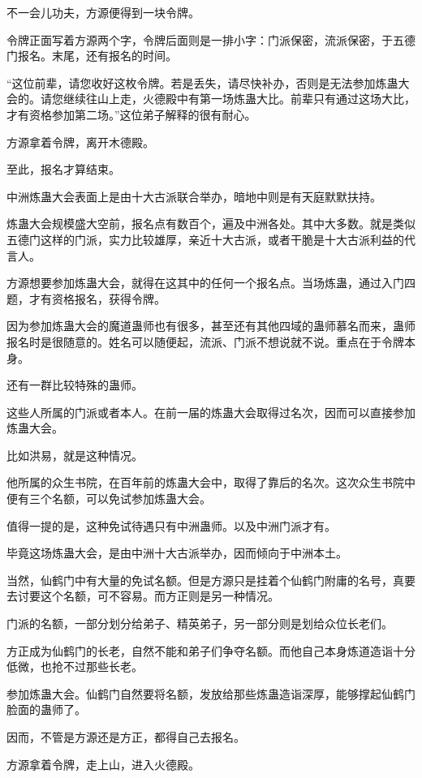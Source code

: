 \begin{this_body}
不一会儿功夫，方源便得到一块令牌。

令牌正面写着方源两个字，令牌后面则是一排小字：门派保密，流派保密，于五德门报名。末尾，还有报名的时间。

“这位前辈，请您收好这枚令牌。若是丢失，请尽快补办，否则是无法参加炼蛊大会的。请您继续往山上走，火德殿中有第一场炼蛊大比。前辈只有通过这场大比，才有资格参加第二场。”这位弟子解释的很有耐心。

方源拿着令牌，离开木德殿。

至此，报名才算结束。

中洲炼蛊大会表面上是由十大古派联合举办，暗地中则是有天庭默默扶持。

炼蛊大会规模盛大空前，报名点有数百个，遍及中洲各处。其中大多数。就是类似五德门这样的门派，实力比较雄厚，亲近十大古派，或者干脆是十大古派利益的代言人。

方源想要参加炼蛊大会，就得在这其中的任何一个报名点。当场炼蛊，通过入门四题，才有资格报名，获得令牌。

因为参加炼蛊大会的魔道蛊师也有很多，甚至还有其他四域的蛊师慕名而来，蛊师报名时是很随意的。姓名可以随便起，流派、门派不想说就不说。重点在于令牌本身。

还有一群比较特殊的蛊师。

这些人所属的门派或者本人。在前一届的炼蛊大会取得过名次，因而可以直接参加炼蛊大会。

比如洪易，就是这种情况。

他所属的众生书院，在百年前的炼蛊大会中，取得了靠后的名次。这次众生书院中便有三个名额，可以免试参加炼蛊大会。

值得一提的是，这种免试待遇只有中洲蛊师。以及中洲门派才有。

毕竟这场炼蛊大会，是由中洲十大古派举办，因而倾向于中洲本土。

当然，仙鹤门中有大量的免试名额。但是方源只是挂着个仙鹤门附庸的名号，真要去讨要这个名额，可不容易。而方正则是另一种情况。

门派的名额，一部分划分给弟子、精英弟子，另一部分则是划给众位长老们。

方正成为仙鹤门的长老，自然不能和弟子们争夺名额。而他自己本身炼道造诣十分低微，也抢不过那些长老。

参加炼蛊大会。仙鹤门自然要将名额，发放给那些炼蛊造诣深厚，能够撑起仙鹤门脸面的蛊师了。

因而，不管是方源还是方正，都得自己去报名。

方源拿着令牌，走上山，进入火德殿。


\end{this_body}
